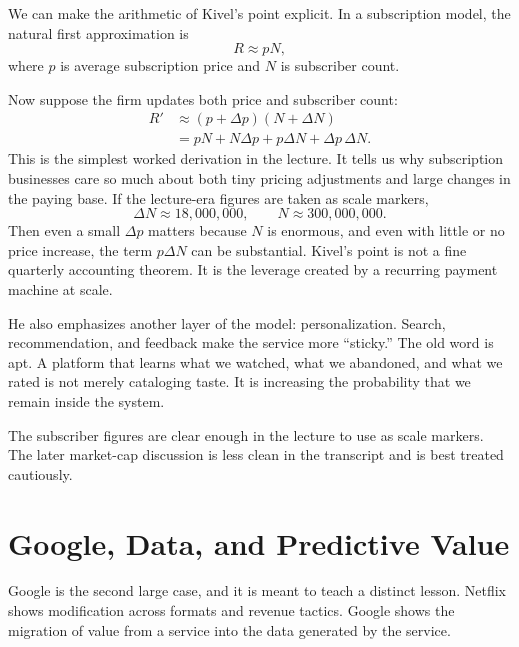 We can make the arithmetic of Kivel's point explicit. In a subscription model, the natural first approximation is
\begin{equation}
R \approx pN,
\end{equation}
where \(p\) is average subscription price and \(N\) is subscriber count.

Now suppose the firm updates both price and subscriber count:
\begin{align}
R' &\approx (p+\Delta p)(N+\Delta N) \\
   &= pN + N\Delta p + p\Delta N + \Delta p\,\Delta N.
\end{align}
This is the simplest worked derivation in the lecture. It tells us why subscription businesses care so much about both tiny pricing adjustments and large changes in the paying base. If the lecture-era figures are taken as scale markers,
\begin{equation}
\Delta N \approx 18{,}000{,}000,
\qquad
N \approx 300{,}000{,}000.
\end{equation}
Then even a small \(\Delta p\) matters because \(N\) is enormous, and even with little or no price increase, the term \(p\Delta N\) can be substantial. Kivel's point is not a fine quarterly accounting theorem. It is the leverage created by a recurring payment machine at scale.

He also emphasizes another layer of the model: personalization. Search, recommendation, and feedback make the service more ``sticky.'' The old word is apt. A platform that learns what we watched, what we abandoned, and what we rated is not merely cataloging taste. It is increasing the probability that we remain inside the system.

\begin{remark}
The subscriber figures are clear enough in the lecture to use as scale markers. The later market-cap discussion is less clean in the transcript and is best treated cautiously.
\end{remark}

\section{Google, Data, and Predictive Value}

Google is the second large case, and it is meant to teach a distinct lesson. Netflix shows modification across formats and revenue tactics. Google shows the migration of value from a service into the data generated by the service.

